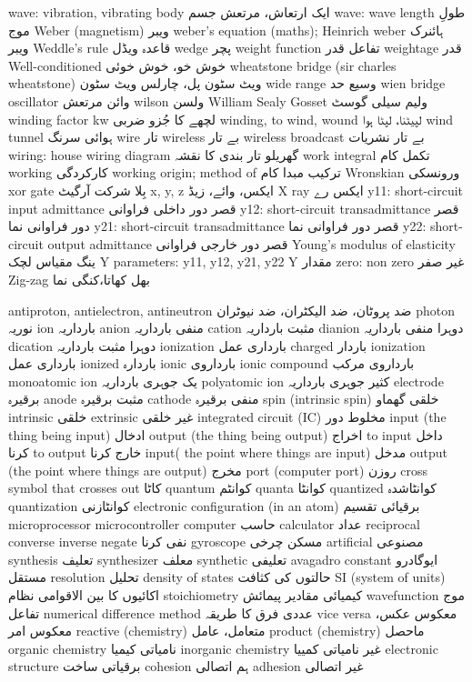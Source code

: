 wave: vibration, vibrating body	ایک ارتعاش، مرتعش جسم
wave: wave length	طولِ موج
Weber (magnetism)	ویبر
weber's equation (maths); Heinrich weber	ہائنرک ویبر
Weddle's rule	قاعدہ ویڈل
wedge	پچر
weight function	تفاعل قدر
weightage	قدر
Well-conditioned	خوش خو، خوش خوئی
wheatstone bridge (sir charles wheatstone)	ویٹ سٹون پل، چارلس ویٹ سٹون
wide range	وسیع حد
wien bridge oscillator	وائن مرتعش
wilson	ولسن
William Sealy Gosset	ولیم سیلی گوسٹ
winding factor kw	لچھے کا جُزو ضربی
winding, to wind, wound	لپیٹنا، لپٹا ہوا
wind tunnel	ہوائی سرنگ
wire	تار
wireless	بے تار
wireless broadcast	بے تار نشریات
wiring: house wiring diagram	گھریلو تار بندی کا نقشہ
work integral	تکمل کام
working	کارکردگی
working origin; method of	ترکیب مبدا کام
Wronskian	ورونسکی
xor gate	بِلا شرکت آرگیٹ
x, y, z	ایکس، وائے، زیڈ
X ray	ایکس رے
y11: short-circuit input admittance	قصر دور داخلی فراوانی
y12: short-circuit  transadmittance	قصر دور فراوانی نما
y21: short-circuit  transadmittance	قصر دور فراوانی نما
y22: short-circuit output admittance	قصر دور خارجی فراوانی
Young's modulus of elasticity	ینگ مقیاس لچک
Y parameters: y11, y12, y21, y22 	Y مقدار
zero: non zero	غیر صفر
Zig-zag	بھل کھاتا،کنگی نما
	
antiproton, antielectron, antineutron	ضد پروٹان، ضد الیکٹران، ضد نیوٹران
photon	نوریہ
ion	بارداریہ
anion	منفی بارداریہ
cation	مثبت بارداریہ
dianion	دوہرا منفی بارداریہ
dication	دوہرا مثبت بارداریہ
ionization	بارداری عمل
charged	باردار
ionization	بارداری عمل
ionized	باردارہ
ionic	بارداروی
ionic compound	بارداروی مرکب
monoatomic ion	یک جوہری بارداریہ
polyatomic ion	کثیر جوہری بارداریہ
electrode	برقیرہ
anode	مثبت برقیرہ
cathode	منفی برقیرہ
spin (intrinsic spin)	خلقی گھماو
intrinsic	خلقی
extrinsic	غیر خلقی
integrated circuit (IC)	مخلوط دور
input (the thing being input)	ادخال
output (the thing being output)	اخراج
to input	داخل کرنا
to output	خارج کرنا
input( the point where things are input)	مدخل
output (the point where things are output)	مخرج
port (computer port)	روزن
cross symbol that crosses out	کاٹا
quantum	کوانٹم
quanta	کوانٹا
quantized	کوانٹاشدہ
quantization	کوانٹازنی
electronic configuration (in an atom)	برقیائی تقسیم
microprocessor	
microcontroller	
computer	حاسب
calculator	عداد
reciprocal	
converse	
inverse	
negate	نفی کرنا
gyroscope	مسکن چرخی
artificial	مصنوعی
synthesis	تعلیف
synthesizer	معلف
synthetic	تعلیفی
avagadro constant	ایوگادرو مستقل
resolution	تحلیل
density of states	حالتوں کی کثافت
SI (system of units)	اکائیوں کا بین الاقوامی نظام
stoichiometry	کیمیائی مقادیر پیمائش
wavefunction	موج تفاعل
numerical difference method	عددی فرق کا طریقہ
vice versa	معکوس عکس، معکوس امر
reactive (chemistry)	متعامل،  عامل
product (chemistry)	ماحصل
organic chemistry	نامیاتی کیمیا
inorganic chemistry	غیر نامیاتی کمییا
electronic structure	برقیاتی ساخت
cohesion	ہم اتصالی
adhesion	غیر اتصالی

